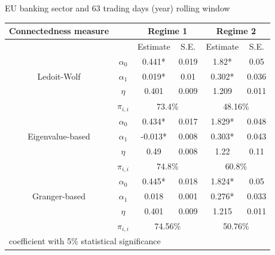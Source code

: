 \documentclass{beamer}
\begin{document}
\begin{frame}
    EU banking sector and 63 trading days (year) rolling window
    \begin{table}\small
        \begin{tabular}{cccccc}
          \toprule
           Connectedness measure &  & \multicolumn{2}{c}{\bfseries Regime 1} & \multicolumn{2}{c}{\bfseries Regime 2}  \\
           \hline
           & & Estimate & S.E. & Estimate & S.E. \\
           \hline
           \multirow{3}{*}[\normalbaselineskip]{Ledoit-Wolf} & $\alpha_0$ & 0.441* & 0.019 & 1.82*  & 0.05 \\
            & $\alpha_1$ & 0.019* & 0.01 & 0.302* & 0.036 \\
            & $\eta$ & 0.401 & 0.009 & 1.209 & 0.011 \\
            & $\pi_{i,i}$ &  \multicolumn{2}{c}{73.4\%} & \multicolumn{2}{c}{48.16\%}\\
            \hline
            \multirow{3}{*}[\normalbaselineskip]{Eigenvalue-based} & $\alpha_0$ & 0.434* & 0.017 & 1.829*  & 0.048 \\
            & $\alpha_1$ & -0.013* & 0.008 & 0.303* & 0.043 \\
            & $\eta$ & 0.49 & 0.008 & 1.22 & 0.11 \\
            & $\pi_{i,i}$ &  \multicolumn{2}{c}{74.8\%} & \multicolumn{2}{c}{60.8\%}\\
            \hline
            \multirow{3}{*}[\normalbaselineskip]{Granger-based} & $\alpha_0$ & 0.445* & 0.018 & 1.824*  & 0.05 \\
            & $\alpha_1$ & 0.018 & 0.001 & 0.276* & 0.033 \\
            & $\eta$ & 0.401 & 0.009 & 1.215 & 0.011 \\
            & $\pi_{i,i}$ &  \multicolumn{2}{c}{74.56\%} & \multicolumn{2}{c}{50.76\%}\\
            \hline
          \multicolumn{6}{l}{\footnotesize * coefficient with 5\% statistical significance} \\
          \hline
        \end{tabular}
      \end{table}

\end{frame}    
\end{document}
